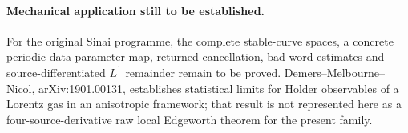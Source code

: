 \paragraph{Mechanical application still to be established.}
For the original Sinai programme, the complete stable-curve spaces, a concrete periodic-data parameter map, returned cancellation, bad-word estimates and source-differentiated $L^1$ remainder remain to be proved. Demers--Melbourne--Nicol, arXiv:1901.00131, establishes statistical limits for Holder observables of a Lorentz gas in an anisotropic framework; that result is not represented here as a four-source-derivative raw local Edgeworth theorem for the present family.

